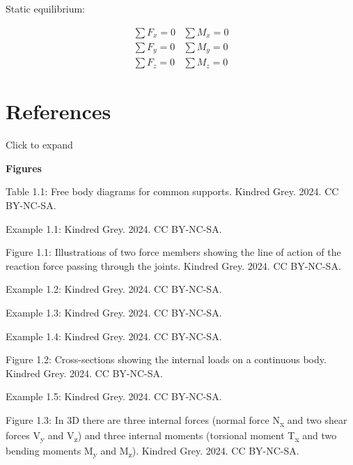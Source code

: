 \documentclass[
  letterpaper,
  DIV=11,
  numbers=noendperiod]{scrreprt}
\theoremstyle{definition}
\theoremstyle{remark}
\begin{document}
\begin{tcolorbox}[enhanced jigsaw, leftrule=.75mm, bottomrule=.15mm, opacityback=0, opacitybacktitle=0.6, colframe=quarto-callout-note-color-frame, toprule=.15mm, colbacktitle=quarto-callout-note-color!10!white, coltitle=black, bottomtitle=1mm, title={Key equations}, titlerule=0mm, toptitle=1mm, colback=white, rightrule=.15mm, left=2mm, arc=.35mm, breakable]

Static equilibrium:

\[
\begin{array}{ll}
\sum F_x=0 & \sum M_x=0 \\
\sum F_y=0 & \sum M_y=0 \\
\sum F_z=0 & \sum M_z=0
\end{array}
\]

\end{tcolorbox}

\section*{References}\label{references}


Click to expand

\textbf{Figures}

Table 1.1: Free body diagrams for common supports. Kindred Grey. 2024.
CC BY-NC-SA.

Example 1.1: Kindred Grey. 2024. CC BY-NC-SA.

Figure 1.1: Illustrations of two force members showing the line of
action of the reaction force passing through the joints. Kindred Grey.
2024. CC BY-NC-SA.

Example 1.2: Kindred Grey. 2024. CC BY-NC-SA.

Example 1.3: Kindred Grey. 2024. CC BY-NC-SA.

Example 1.4: Kindred Grey. 2024. CC BY-NC-SA.

Figure 1.2: Cross-sections showing the internal loads on a continuous
body. Kindred Grey. 2024. CC BY-NC-SA.

Example 1.5: Kindred Grey. 2024. CC BY-NC-SA.

Figure 1.3: In 3D there are three internal forces (normal force
N\textsubscript{x} and two shear forces V\textsubscript{y} and
V\textsubscript{z}) and three internal moments (torsional moment
T\textsubscript{x} and two bending moments M\textsubscript{y} and
M\textsubscript{z}). Kindred Grey. 2024. CC BY-NC-SA.
\end{document}
